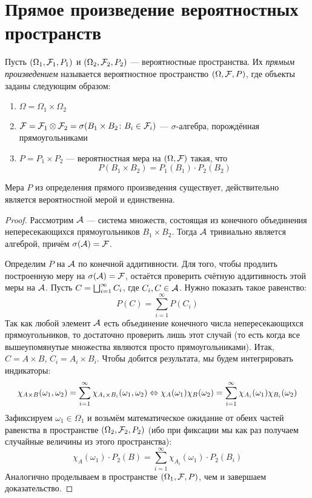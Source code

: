 \section{Прямое произведение вероятностных пространств}

\begin{definition}
	Пусть $(\Omega_1, \mathcal{F}_1, P_1)$ и $(\Omega_2, \mathcal{F}_2, P_2)$ --- вероятностные пространства. Их \textit{прямым произведением} называется вероятностное пространство $(\Omega, \mathcal{F}, P)$, где объекты заданы следующим образом:
	\begin{enumerate}
		\item $\Omega = \Omega_1 \times \Omega_2$
		
		\item $\mathcal{F} = \mathcal{F}_1 \otimes \mathcal{F}_2 = \sigma(B_1 \times B_2 \colon B_i \in \mathcal{F}_i)$ --- $\sigma$-алгебра, порождённая прямоугольниками
		
		\item $P = P_1 \times P_2$ --- вероятностная мера на $(\Omega, \mathcal{F})$ такая, что
		\[
			P(B_1 \times B_2) = P_1(B_1) \cdot P_2(B_2)
		\]
	\end{enumerate}
\end{definition}

\begin{lemma}
	Мера $P$ из определения прямого произведения существует, действительно является вероятностной мерой и единственна.
\end{lemma}

\begin{proof}
	Рассмотрим $\mathcal{A}$ --- система множеств, состоящая из конечного объединения непересекающихся прямоугольников $B_1 \times B_2$. Тогда $\mathcal{A}$ тривиально является алгеброй, причём $\sigma(\mathcal{A}) = \mathcal{F}$.
	
	Определим $P$ на $\mathcal{A}$ по конечной аддитивности. Для того, чтобы продлить построенную меру на $\sigma(\mathcal{A}) = \mathcal{F}$, остаётся проверить счётную аддитивность этой меры на $\mathcal{A}$. Пусть $C = \bigsqcup_{i = 1}^\infty C_i$, где $C_i, C \in \mathcal{A}$. Нужно показать такое равенство:
	\[
		P(C) = \sum_{i = 1}^\infty P(C_i)
	\]
	Так как любой элемент $\mathcal{A}$ есть объединение конечного числа непересекающихся прямоугольников, то достаточно проверить лишь этот случай (то есть когда все вышеупомянутые множества являются просто прямоугольниками). Итак, $C = A \times B$, $C_i = A_i \times B_i$. Чтобы добится результата, мы будем интегрировать индикаторы:
	\[
		\chi_{A \times B}(\omega_1, \omega_2) = \sum_{i = 1}^\infty \chi_{A_i \times B_i}(\omega_1, \omega_2) \Leftrightarrow \chi_A(\omega_1)\chi_B(\omega_2) = \sum_{i = 1}^\infty \chi_{A_i}(\omega_1)\chi_{B_i}(\omega_2)
	\]
	Зафиксируем $\omega_1 \in \Omega_1$ и возьмём математическое ожидание от обеих частей равенства в пространстве $(\Omega_2, \mathcal{F}_2, P_2)$ (ибо при фиксации мы как раз получаем случайные величины из этого пространства):
	\[
		\chi_A(\omega_1) \cdot P_2(B) = \sum_{i = 1}^\infty \chi_{A_i}(\omega_1) \cdot P_2(B_i)
	\]
	Аналогично проделываем в пространстве $(\Omega_1, \mathcal{F}, P)$, чем и завершаем доказательство.
\end{proof}

